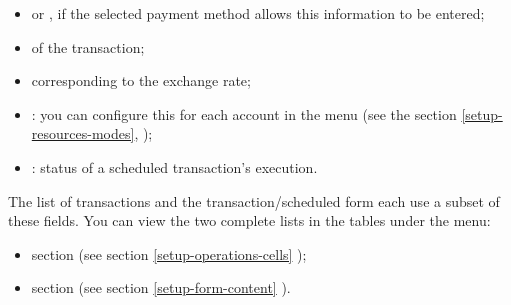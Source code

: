 \begin{itemize}
	\item {} or , if the selected payment method allows this information to be entered;
	\item {} of the transaction;
	\item {} corresponding to the exchange rate;
	\item {}: you can configure this for each account in the  menu (see the section \vref{setup-resources-modes}, );
	\item {}: status of a scheduled transaction's execution.
\end{itemize}

The list of transactions and the transaction/scheduled form each use a subset of these fields. You can view the two complete lists in the tables under the  menu:
\begin{itemize}
	\item section  (see section \vref{setup-operations-cells} );
	\item section  (see section \vref{setup-form-content} ).
\end{itemize}


